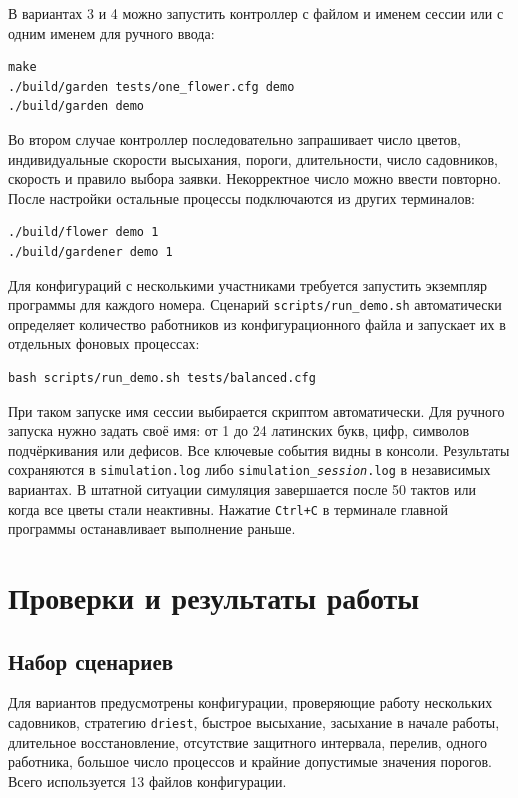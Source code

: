 \documentclass[12pt,a4paper]{article}
\begin{document}
В вариантах 3 и 4 можно запустить контроллер с файлом и именем сессии или с одним именем для ручного ввода:
\begin{lstlisting}
make
./build/garden tests/one_flower.cfg demo
./build/garden demo
\end{lstlisting}

Во втором случае контроллер последовательно запрашивает число цветов, индивидуальные скорости высыхания, пороги, длительности, число садовников, скорость и правило выбора заявки. Некорректное число можно ввести повторно. После настройки остальные процессы подключаются из других терминалов:
\begin{lstlisting}
./build/flower demo 1
./build/gardener demo 1
\end{lstlisting}

Для конфигураций с несколькими участниками требуется запустить экземпляр программы для каждого номера. Сценарий \texttt{scripts/run\_demo.sh} автоматически определяет количество работников из конфигурационного файла и запускает их в отдельных фоновых процессах:
\begin{lstlisting}
bash scripts/run_demo.sh tests/balanced.cfg
\end{lstlisting}

При таком запуске имя сессии выбирается скриптом автоматически. Для ручного запуска нужно задать своё имя: от 1 до 24 латинских букв, цифр, символов подчёркивания или дефисов. Все ключевые события видны в консоли. Результаты сохраняются в \texttt{simulation.log} либо \texttt{simulation\_\textit{session}.log} в независимых вариантах. В штатной ситуации симуляция завершается после 50 тактов или когда все цветы стали неактивны. Нажатие \texttt{Ctrl+C} в терминале главной программы останавливает выполнение раньше.

\section{Проверки и результаты работы}
\subsection{Набор сценариев}
Для вариантов предусмотрены конфигурации, проверяющие работу нескольких садовников, стратегию \texttt{driest}, быстрое высыхание, засыхание в начале работы, длительное восстановление, отсутствие защитного интервала, перелив, одного работника, большое число процессов и крайние допустимые значения порогов. Всего используется 13 файлов конфигурации.
\end{document}
